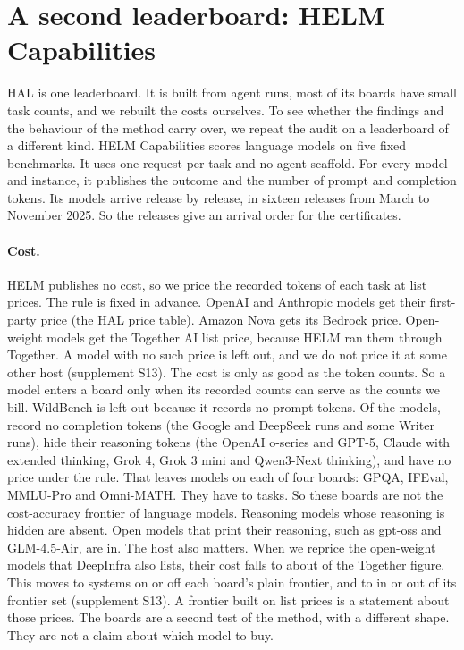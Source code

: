 \documentclass[11pt]{article}
\begin{document}
\section{A second leaderboard: HELM Capabilities}
\label{sec:helm}
HAL is one leaderboard. It is built from agent runs, most of its boards have small task counts, and we rebuilt the costs ourselves. To see whether the findings and the behaviour of the method carry over, we repeat the audit on a leaderboard of a different kind. HELM Capabilities \citep{crfm2025helmcapabilities,liang2023helm} scores language models on five fixed benchmarks. It uses one request per task and no agent scaffold. For every model and instance, it publishes the outcome and the number of prompt and completion tokens. Its \NumHelmModelsTotal{} models arrive release by release, in sixteen releases from March to November 2025. So the releases give an arrival order for the certificates.

\paragraph{Cost.}
HELM publishes no cost, so we price the recorded tokens of each task at list prices. The rule is fixed in advance. OpenAI and Anthropic models get their first-party price (the HAL price table). Amazon Nova gets its Bedrock price. Open-weight models get the Together AI list price, because HELM ran them through Together. A model with no such price is left out, and we do not price it at some other host (supplement S13). The cost is only as good as the token counts. So a model enters a board only when its recorded counts can serve as the counts we bill. WildBench is left out because it records no prompt tokens. Of the \NumHelmModelsTotal{} models, \NumHelmDroppedCompletion{} record no completion tokens (the Google and DeepSeek runs and some Writer runs), \NumHelmDroppedHidden{} hide their reasoning tokens (the OpenAI o-series and GPT-5, Claude with extended thinking, Grok 4, Grok 3 mini and Qwen3-Next thinking), and \NumHelmDroppedNoPrice{} have no price under the rule. That leaves \NumHelmSystemsBoard{} models on each of four boards: GPQA, IFEval, MMLU-Pro and Omni-MATH. They have \NumHelmTasksMin{} to \NumHelmTasksMax{} tasks. So these boards are not the cost-accuracy frontier of language models. Reasoning models whose reasoning is hidden are absent. Open models that print their reasoning, such as gpt-oss and GLM-4.5-Air, are in. The host also matters. When we reprice the \NumHelmPriceModels{} open-weight models that DeepInfra also lists, their cost falls to about \NumHelmPriceCostRatio{} of the Together figure. This moves \NumHelmPriceFrontierChangedMin{} to \NumHelmPriceFrontierChangedMax{} systems on or off each board's plain frontier, and \NumHelmPriceSetChangedMin{} to \NumHelmPriceSetChangedMax{} in or out of its frontier set (supplement S13). A frontier built on list prices is a statement about those prices. The boards are a second test of the method, with a different shape. They are not a claim about which model to buy.
\end{document}
